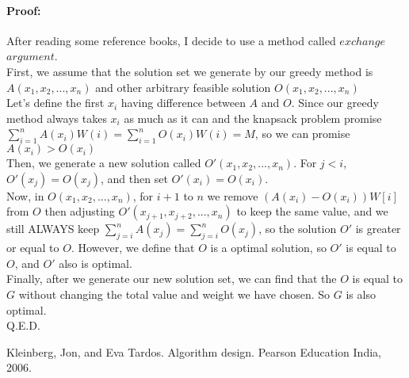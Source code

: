 \documentclass{article}
\begin{document}
	\paragraph{Proof:}
	After reading some reference books, I decide to use a method called $exchange$ $argument$\cite{algorithm_design(2005)}. \\
	First, we assume that the solution set we generate by our greedy method is $A(x_1, x_2, ..., x_n)$ and other arbitrary feasible solution $O(x_1, x_2, ... ,x_n)$\\
	Let's define the first $x_i$ having difference between $A$ and $O$. Since our greedy method always takes $x_i$ as much as it can and the knapsack problem promise $\sum_{i=1}^{n} A(x_i)W(i) = \sum_{i=1}^{n} O(x_i)W(i) = M$, so we can promise $A(x_i) > O(x_i)$\\
	Then, we generate a new solution called $O'(x_1, x_2, ..., x_n)$. For $j < i$, $O'(x_j) = O(x_j)$, and then set $O'(x_i) = O(x_i)$.\\
	Now, in $O(x_1, x_2, ... ,x_n)$, for $i + 1$ to $n$ we remove $(A(x_i) - O(x_i))W[i]$ from $O$ then adjusting $O'(x_{j+1}, x_{j+2}, ..., x_n)$ to keep the same value, and we still ALWAYS keep $\sum_{j=i}^{n} A(x_j) = \sum_{j=i}^{n}O(x_j)$, so the solution $O'$ is greater or equal to $O$. However, we define that $O$ is a optimal solution, so $O'$ is equal to $O$, and $O'$ also is optimal.\\
	Finally, after we generate our new solution set, we can find that the $O$ is equal to 
	$G$ without changing the total value and weight we have chosen. So $G$ is also optimal.\\
	Q.E.D.\\
	
	
\begin{thebibliography}{0}
	Kleinberg, Jon, and Eva Tardos. Algorithm design. Pearson Education India, 2006.
\end{thebibliography}	
\end{document}
